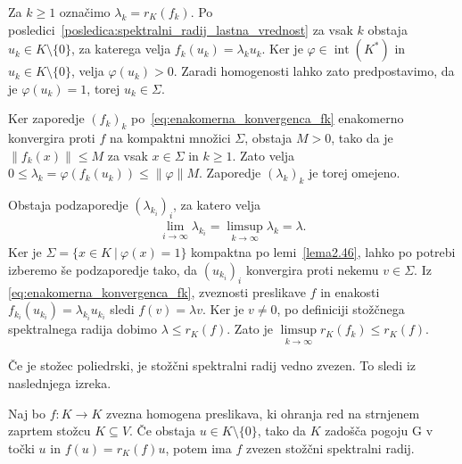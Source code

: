 \documentclass[mat2, tisk]{fmfdelo}
\begin{document}
\begin{dokaz}
  Za $k\geq1$ označimo $\lambda_k=r_K(f_k)$. Po posledici~\ref{posledica:spektralni_radij_lastna_vrednost} za vsak
  $k$ obstaja $u_k\in K\setminus\{0\}$, za katerega velja
  $f_k(u_k)=\lambda_k u_k$. 
  Ker je $\varphi\in\operatorname{int}(K^*)$ in
  $u_k\in K\setminus\{0\}$, velja $\varphi(u_k)>0$.
  Zaradi homogenosti lahko zato predpostavimo, da je
  $\varphi(u_k)=1$, torej $u_k\in\Sigma$.

  Ker zaporedje $(f_k)_k$ po~\eqref{eq:enakomerna_konvergenca_fk}
  enakomerno konvergira proti $f$ na kompaktni množici $\Sigma$,
  obstaja $M>0$, tako da je $\|f_k(x)\|\leq M$ za vsak
  $x\in\Sigma$ in $k\geq1$. Zato velja
  $0\leq\lambda_k=\varphi(f_k(u_k))\leq\|\varphi\|M$.
  Zaporedje $(\lambda_k)_k$ je torej omejeno.

  Obstaja podzaporedje $(\lambda_{k_i})_i$, za katero velja
  \begin{align*}
  \lim_{i\to\infty}\lambda_{k_i}
  =
  \limsup_{k\to\infty}\lambda_k
  =
  \lambda.
  \end{align*}
  Ker je $\Sigma=\{x\in K ~|~ \varphi(x)=1\}$ kompaktna po lemi~\ref{lema2.46}, lahko
  po potrebi izberemo še podzaporedje tako, da $(u_{k_i})_i$ konvergira
  proti nekemu $v\in\Sigma$. Iz
  \eqref{eq:enakomerna_konvergenca_fk}, zveznosti preslikave $f$ in
  enakosti $f_{k_i}(u_{k_i})=\lambda_{k_i}u_{k_i}$ sledi
  $f(v)=\lambda v$. Ker je $v\neq0$, po definiciji stožčnega spektralnega
  radija dobimo $\lambda\leq r_K(f)$. Zato je
  $\limsup\limits_{k\to\infty}r_K(f_k)\leq r_K(f)$.
\end{dokaz}

Če je stožec poliedrski, je stožčni spektralni radij vedno zvezen.
To sledi iz naslednjega izreka.

\begin{izrek}\label{izr:zveznost_stozcnega_spektralnega_radija_pogoj_G}
  Naj bo $f\colon K\longrightarrow K$ zvezna homogena preslikava, ki
  ohranja red na strnjenem zaprtem stožcu $K\subseteq V$. Če obstaja
  $u\in K\setminus\{0\}$, tako da $K$ zadošča pogoju G v točki $u$ in
  $f(u)=r_K(f)u$, potem ima $f$ zvezen stožčni spektralni radij.
\end{izrek}
\end{document}
